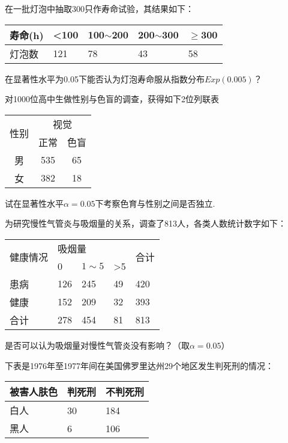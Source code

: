 \begin{xiti}
\item 在一批灯泡中抽取300只作寿命试验，其结果如下：
\begin{table}[!htp]
	\centering
	\begin{tabularx}{1.0\textwidth}{Z|ZZZZ}
		寿命(h)&<100&100$\sim$200&200$\sim $300&$\geq $300\\
		\midrule
		灯泡数&121&78&43&58
	\end{tabularx}
\end{table}

在显著性水平为0.05下能否认为灯泡寿命服从指数分布$Exp(0.005)$？

\item 对1000位高中生做性别与色盲的调查，获得如下2位列联表
\begin{table}[!htb]
	\centering
	\begin{tabular}{c|cc}\hline
		\multirow{2}[0]{*}{性别} & \multicolumn{2}{c}{视觉} \\
		& 正常    & 色盲 \\\hline
		男     & 535   & 65 \\\hline
		女     & 382   & 18 \\\hline
	\end{tabular}
\end{table}

试在显著性水平$\alpha=0.05$下考察色育与性别之间是否独立.

\item 为研究慢性气管炎与吸烟量的关系，调查了813人，各类人数统计数字如下：
\begin{table}[!htb]
	\centering
	\begin{tabular}{l|llll}
		\toprule
		\multirow{2}{*}{健康情况} & \multicolumn{3}{l}{\hspace{2em}吸烟量} & \multirow{2}{*}{合计} \\
		& 0      & $1\sim 5$    & >5   &                     \\
		\midrule
		患病                    & 126    & 245    & 49    & 420                 \\
		健康                    & 152    & 209    & 32    & 393                 \\
		合计                    & 278    & 454    & 81    & 813                \\
		\bottomrule
	\end{tabular}
\end{table}
是否可以认为吸烟量对慢性气管炎没有影响？（取$\alpha=0.05$）

\item 下表是1976年至1977年间在美国佛罗里达州29个地区发生判死刑的情况：
	\begin{table}[!ht]
	\centering
	\begin{tabularx}{1.0\textwidth}{Z|ZZ}
		\toprule
		被害人肤色&判死刑&不判死刑\\
		\midrule
		白人&30&184\\
		黑人&6&106\\
		\bottomrule
	\end{tabularx}
\end{table}


\end{xiti}
